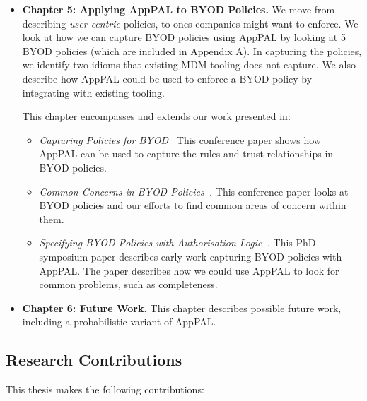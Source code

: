 \documentclass[thesis.tex]{subfiles}
\begin{document}
\begin{itemize}
\item \textbf{Chapter 5: Applying AppPAL to \ac{BYOD} Policies.}
  We move from describing \emph{user-centric} policies, to ones companies might
  want to enforce. We look at how we can capture \ac{BYOD} policies using AppPAL by
  looking at 5 \ac{BYOD} policies (which are included in Appendix A). In capturing the
  policies, we identify two idioms that existing MDM tooling does not capture. We
  also describe how AppPAL could be used to enforce a \ac{BYOD} policy by integrating
  with existing tooling.
  
  This chapter encompasses and extends our work presented in:
  \begin{itemize}
  \item\emph{Capturing Policies for
      \ac{BYOD}~\cite{hallett_capturing_2017}} This conference paper shows
    how AppPAL can be used to capture the rules and trust relationships in
    \ac{BYOD} policies.
  \item\emph{Common Concerns in \ac{BYOD}
      Policies~\cite{hallett_common_2017}.} This conference paper looks at
    \ac{BYOD} policies and our efforts to find common areas of concern
    within them.
  \item\emph{Specifying \ac{BYOD} Policies with Authorisation
      Logic~\cite{hallett_specifying_2016}.} This PhD symposium paper
    describes early work capturing \ac{BYOD} policies with AppPAL.  The
    paper describes how we could use AppPAL to look for common problems,
    such as completeness.
  \end{itemize}

\item \textbf{Chapter 6: Future Work.}
  This chapter describes possible future work, including a probabilistic variant of AppPAL.
 
\end{itemize}

\subsection{Research Contributions}

This thesis makes the following contributions:
\end{document}
